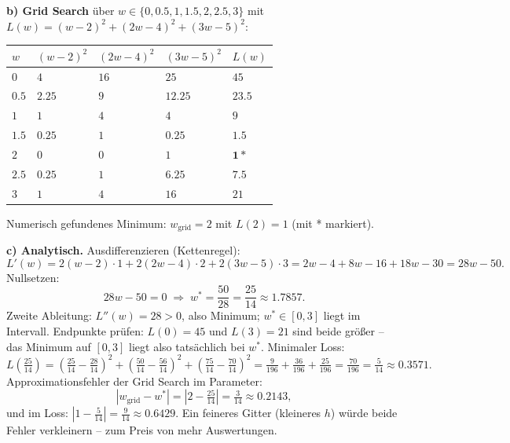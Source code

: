 \documentclass[11pt,a4paper]{scrartcl}
\begin{document}
\textbf{b) Grid Search} über $w \in \{0, 0.5, 1, 1.5, 2, 2.5, 3\}$ mit
$L(w) = (w - 2)^2 + (2w - 4)^2 + (3w - 5)^2$:
\begin{center}
\begin{tabular}{lllll}
\toprule
$w$ & $(w-2)^2$ & $(2w-4)^2$ & $(3w-5)^2$ & $L(w)$ \\
\midrule
$0$   & $4$    & $16$  & $25$    & $45$ \\
$0.5$ & $2.25$ & $9$   & $12.25$ & $23.5$ \\
$1$   & $1$    & $4$   & $4$     & $9$ \\
$1.5$ & $0.25$ & $1$   & $0.25$  & $1.5$ \\
$2$   & $0$    & $0$   & $1$     & $\mathbf{1\ast}$ \\
$2.5$ & $0.25$ & $1$   & $6.25$  & $7.5$ \\
$3$   & $1$    & $4$   & $16$    & $21$ \\
\bottomrule
\end{tabular}
\end{center}
Numerisch gefundenes Minimum: $w_{\text{grid}} = 2$ mit $L(2) = 1$ (mit * markiert).

\textbf{c) Analytisch.} Ausdifferenzieren (Kettenregel):
\[
L'(w) = 2(w - 2) \cdot 1 + 2(2w - 4) \cdot 2 + 2(3w - 5) \cdot 3
      = 2w - 4 + 8w - 16 + 18w - 30 = 28w - 50 .
\]
Nullsetzen:
\[
28w - 50 = 0 \;\Rightarrow\; w^\ast = \frac{50}{28} = \frac{25}{14} \approx 1.7857 .
\]
Zweite Ableitung: $L''(w) = 28 > 0$, also Minimum; $w^\ast \in [0,3]$ liegt im Intervall.
Endpunkte prüfen: $L(0) = 45$ und $L(3) = 21$ sind beide größer -- das Minimum auf $[0,3]$
liegt also tatsächlich bei $w^\ast$. Minimaler Loss:
\[
L\!\left(\tfrac{25}{14}\right)
= \left(\tfrac{25}{14} - \tfrac{28}{14}\right)^2
+ \left(\tfrac{50}{14} - \tfrac{56}{14}\right)^2
+ \left(\tfrac{75}{14} - \tfrac{70}{14}\right)^2
= \tfrac{9}{196} + \tfrac{36}{196} + \tfrac{25}{196}
= \tfrac{70}{196} = \tfrac{5}{14} \approx 0.3571 .
\]
Approximationsfehler der Grid Search im Parameter:
\[
|w_{\text{grid}} - w^\ast| = \left|2 - \tfrac{25}{14}\right| = \tfrac{3}{14} \approx 0.2143 ,
\]
und im Loss: $|1 - \tfrac{5}{14}| = \tfrac{9}{14} \approx 0.6429$. Ein feineres Gitter
(kleineres $h$) würde beide Fehler verkleinern -- zum Preis von mehr Auswertungen.
\end{document}
